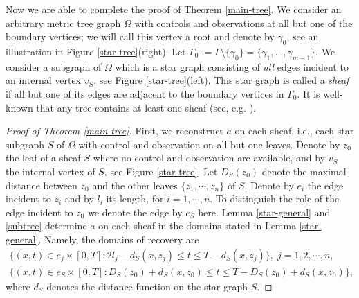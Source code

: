 \documentclass[11pt]{amsart}
\theoremstyle{definition}
\theoremstyle{plain}
\numberwithin{equation}{section}
\newcommand\Ga{\Gamma}
\newcommand\ga{\gamma}
\newcommand\Om{\Omega}
\begin{document}
Now we are able to complete the proof of Theorem \ref{main-tree}.
We consider an arbitrary metric tree graph $\Om$ with controls and observations at all but one of the boundary vertices; we will call this vertex a root and denote by $\ga_0$, see an illustration in Figure \ref{star-tree}(right). Let $\Ga_0:=\Ga \setminus \{\ga_0\} =
\{\ga_1,\ldots,\ga_{m-1}\}.$  
 We consider a subgraph of $\Om$ which is a star graph 
consisting of {\sl all} edges incident to an internal vertex $v_S$, see Figure \ref{star-tree}(left). This star graph is called a \emph{sheaf}
if all but one of its edges are adjacent to the boundary vertices in $\Ga_0$.
It is well-known that any tree contains at least one sheaf (see, e.g. \cite{ACLM}).

\begin{proof}[Proof of Theorem \ref{main-tree}]
First, we reconstruct $a$ on each sheaf, i.e., each star subgraph $S$ of $\Omega$ with control and observation on all but one leaves.
Denote by $z_0$ the leaf of a sheaf $S$ where no control and observation are available, and by $v_S$ the internal vertex of $S$, see Figure \ref{star-tree}. 
Let $D_S(z_0)$ denote the maximal distance between $z_0$ and the other leaves $\{z_1,\cdots,z_{n}\}$ of $S$.
Denote by $e_i$ the edge incident to $z_i$ and by $l_i$ its length, for $i=1,\cdots,n$.
To distinguish the role of the edge incident to $z_0$ we denote the edge by $e_S$ here.
Lemma \ref{star-general} and \ref{subtree} determine $a$ on each sheaf in the domains stated in Lemma \ref{star-general}. Namely, the domains of recovery are
\begin{eqnarray} 
\big\{(x,t)\in e_j\times [0,T]: 2l_j-d_S(x,z_j)\leq t\leq T-d_S(x,z_j)  \big\},\; j=1,2,\cdots,n, \label{proof-domain-ej} \\
\big\{ (x,t)\in e_S\times [0,T]:  D_S(z_0)+d_S(x,z_0) \leq t \leq T-D_S(z_0)+d_S(x,z_0)\big\}, \label{proof-domain-e0}
\end{eqnarray}
where $d_S$ denotes the distance function on the star graph $S$.



\end{proof}
\end{document}
